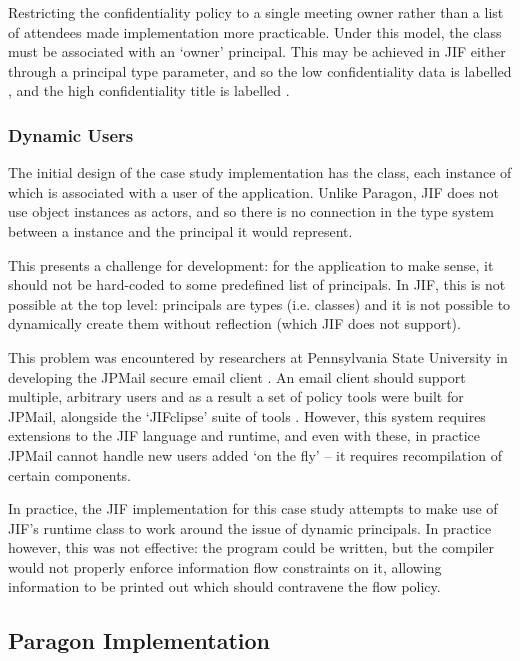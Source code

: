 Restricting the confidentiality policy to a single meeting owner rather than a list of attendees made implementation more practicable. Under this model, the  class must be associated with an `owner' principal. This may be achieved in JIF either through a principal type parameter, and so the low confidentiality data is labelled , and the high confidentiality title is labelled .

\subsubsection{Dynamic Users}

The initial design of the case study implementation has the  class, each instance of which is associated with a user of the application. Unlike Paragon, JIF does not use object instances as actors, and so there is no connection in the type system between a  instance and the principal it would represent.

This presents a challenge for development: for the application to make sense, it should not be hard-coded to some predefined list of principals. In JIF, this is not possible at the top level: principals are types (i.e. classes) and it is not possible to dynamically create them without reflection (which JIF does not support).

This problem was encountered by researchers at Pennsylvania State University in developing the JPMail secure email client \cite{jpmailpage}. An email client should support multiple, arbitrary users and as a result a set of policy tools were built for JPMail, alongside the `JIFclipse' suite of tools \cite{hicks2007jifclipse}. However, this system requires extensions to the JIF language and runtime, and even with these, in practice JPMail cannot handle new users added `on the fly' -- it requires recompilation of certain components.

In practice, the JIF implementation for this case study attempts to make use of JIF's runtime  class to work around the issue of dynamic principals. In practice however, this was not effective: the program could be written, but the compiler would not properly enforce information flow constraints on it, allowing information to be printed out which should contravene the flow policy.

\subsection{Paragon Implementation}

